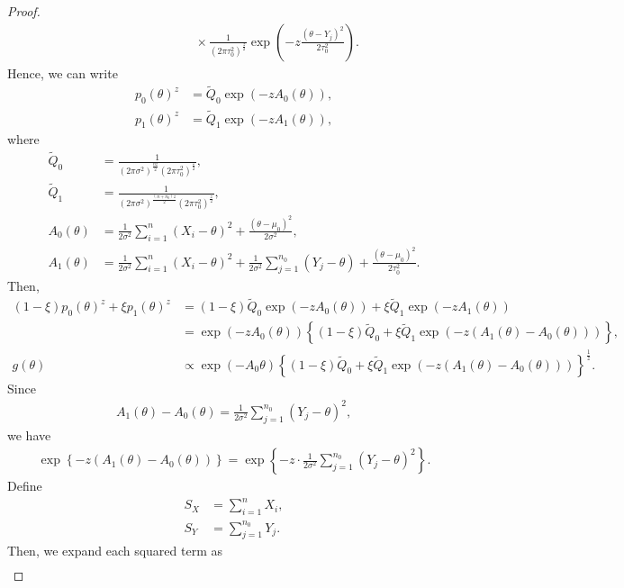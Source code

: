 \documentclass[12pt]{article}
\begin{document}
\begin{proof}
\begin{align*}
       &\quad\quad\quad\quad\quad\quad \times \frac{1}{(2\pi\tau_0^2)^{\frac{z}{2}}}\exp\left(-z\frac{(\theta - Y_j)^2}{2\tau_0^2}\right).
   \end{align*}
   Hence, we can write
   \begin{align*}
       p_0(\theta)^z &= \tilde{Q}_0 \exp\left(-z A_0(\theta) \right), \\
       p_1(\theta)^z &= \tilde{Q}_1 \exp\left(-z A_1(\theta) \right),
   \end{align*}
   where
   \begin{align*}
       \tilde{Q}_0 &= \frac{1}{(2\pi\sigma^2)^{\frac{nz}{2}}(2\pi\tau_0^2)^{\frac{z}{2}}}, \\
       \tilde{Q}_1 &= \frac{1}{(2\pi\sigma^2)^{\frac{(n + n_0)z}{2}}(2\pi\tau_0^2)^{\frac{z}{2}}}, \\
       A_0(\theta) &= \frac{1}{2\sigma^2}\sum^n_{i=1}(X_i - \theta)^2 + \frac{(\theta - \mu_0)^2}{2\sigma^2}, \\
       A_1(\theta) &= \frac{1}{2\sigma^2}\sum^n_{i=1}(X_i - \theta)^2 + \frac{1}{2\sigma^2}\sum^{n_0}_{j=1}(Y_j - \theta) + \frac{(\theta - \mu_0)^2}{2\tau_0^2}.
   \end{align*}
   Then,
   \begin{align*}
       (1 - \xi) p_0(\theta)^z + \xi p_1(\theta)^z &= (1 - \xi)\tilde{Q}_0 \exp(-z A_0(\theta)) + \xi \tilde{Q}_1 \exp(-z A_1(\theta)) \\
       &= \exp(-z A_0(\theta))\left\{(1 - \xi)\tilde{Q}_0 + \xi \tilde{Q}_1 \exp(-z(A_1(\theta) - A_0(\theta)))\right\}, \\
       g(\theta) &\propto \exp(-A_0 \theta)\left\{(1 - \xi)\tilde{Q}_0 + \xi \tilde{Q}_1 \exp(-z(A_1(\theta) - A_0(\theta)))\right\}^{\frac{1}{z}}.
   \end{align*}
   Since
   \begin{align*}
       A_1(\theta) - A_0(\theta) = \frac{1}{2\sigma^2}\sum^{n_0}_{j=1}(Y_j - \theta)^2,
   \end{align*}
   we have
   \begin{align*}
       \exp\left\{-z(A_1(\theta) - A_0(\theta))\right\} = \exp\left\{-z\cdot \frac{1}{2\sigma^2}\sum^{n_0}_{j=1}(Y_j - \theta)^2\right\}.
   \end{align*}
   Define
   \begin{align*}
       S_X &= \sum^n_{i=1}X_i, \\
       S_Y &= \sum^{n_0}_{j=1}Y_j.
   \end{align*}
   Then, we expand each squared term as
   \begin{align*}

\end{align*}
\end{proof}
\end{document}
